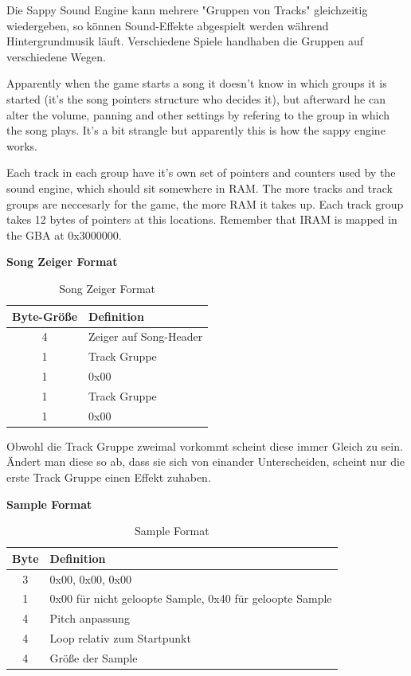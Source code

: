 \documentclass[11pt,a4paper]{scrartcl}
\begin{document}
Die Sappy Sound Engine kann mehrere "Gruppen von Tracks" gleichzeitig wiedergeben, so k\"{o}nnen Sound-Effekte abgespielt werden w\"{a}hrend Hintergrundmusik l\"{a}uft. Verschiedene Spiele handhaben die Gruppen auf verschiedene Wegen.

Apparently when the game starts a song it doesn't know in which groups it is started (it's the song pointers structure who decides it), but afterward he can alter the volume, panning and other settings by refering to the group in which the song plays. It's a bit strangle but apparently this is how the sappy engine works.

Each track in each group have it's own set of pointers and counters used by the sound engine, which should sit somewhere in RAM. The more tracks and track groups are neccesarly for the game, the more RAM it takes up.
Each track group takes 12 bytes of pointers at this locations. Remember that IRAM is mapped in the GBA at 0x3000000.

\vspace{15pt}
\textbf{{\large Song Zeiger Format}}

\begin{table}[h]
    \centering
    \begin{tabular}{ c | p{8cm} }
        \textbf{Byte-Gr\"{o}{\ss}e} & \textbf{Definition}\\
        \hline
        4 & Zeiger auf Song-Header\\
				\hline
        1 & Track Gruppe\\
				\hline
        1 & 0x00\\
				\hline
        1 & Track Gruppe\\
				\hline
        1 & 0x00\\
    \end{tabular}
    \caption{Song Zeiger Format}
    \label{table:SongZeiger}
\end{table}

Obwohl die Track Gruppe zweimal vorkommt scheint diese immer Gleich zu sein. \"{A}ndert man diese so ab, dass sie sich von einander Unterscheiden, scheint nur die erste Track Gruppe einen Effekt zuhaben.


\newpage
\textbf{{\large Sample Format}}

\begin{table}[h]
    \centering
    \begin{tabular}{ c | p{15cm} }
        \textbf{Byte} & \textbf{Definition}\\
				\hline
        3 & 0x00, 0x00, 0x00\\
				\hline
        1 & 0x00 f\"{u}r nicht geloopte Sample, 0x40 f\"{u}r geloopte Sample\\
				\hline
        4 & Pitch anpassung\\
				\hline
        4 & Loop relativ zum Startpunkt\\
				\hline
        4 & Gr\"{o}{\ss}e der Sample\\
    \end{tabular}
    \caption{Sample Format}
    \label{table:SampleFormat}
\end{table}
\end{document}
